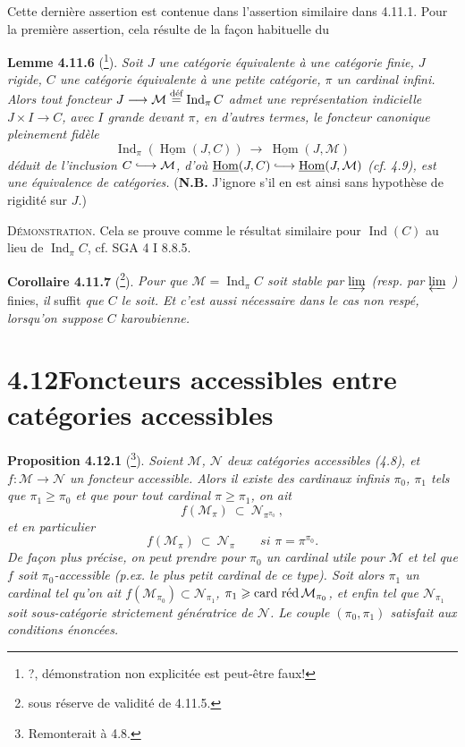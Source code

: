 \documentclass[11pt]{article}
\newcommand{\printedpage}[1]{\marginpar{\footnotesize p.~#1}}
\newcommand{\msp}[1]{\marginpar{\footnotesize [#1]}}
\newcommand{\defeq}{\overset{\text{\upshape déf}}{=}}
\newcommand{\cardred}{\operatorname{card}\,\text{\upshape réd}\,}
\newcommand{\Hom}{\underline{\operatorname{Hom}}}
\newcommand{\Ind}{\operatorname{Ind}}
\newcommand{\into}{\lhook\joinrel\longrightarrow}
\begin{document}
Cette dernière assertion est contenue dans l'assertion similaire dans 4.11.1. Pour la première assertion, cela résulte de la façon habituelle du

\textbf{Lemme 4.11.6} (\footnote{?, démonstration non explicitée est peut-être faux!}). \textit{Soit $J$ une catégorie équivalente à une catégorie finie, $J$ rigide, $C$ une catégorie équivalente à une petite catégorie, $\pi$ un cardinal infini. Alors tout foncteur}
\printedpage{102}
\textit{$J \longrightarrow \mathcal{M} \defeq \Ind_\pi C$ admet une représentation indicielle $J \times I \longrightarrow C$, avec $I$ grande devant $\pi$, en d'autres termes, le} \msp{page 272} \textit{foncteur canonique pleinement fidèle}
\[
\Ind_\pi(\Hom(J,C)) \ \longrightarrow \ \Hom(J,\mathcal{M})
\]
\textit{déduit de l'inclusion $C \into \mathcal{M}$, d'où $\Hom(J,C) \into \Hom(J,\mathcal{M})$ (cf. 4.9), est une équivalence de catégories.} (\textbf{N.B.} J'ignore s'il en est ainsi sans hypothèse de rigidité sur $J$.)

\textsc{Démonstration}. Cela se prouve comme le résultat similaire pour $\Ind(C)$ au lieu de $\Ind_\pi C$, cf. SGA 4 I 8.8.5.

\msp{page 273}

\textbf{Corollaire 4.11.7} (\footnote{sous réserve de validité de 4.11.5.}). \textit{Pour que $\mathcal{M} = \Ind_\pi C$ soit stable par $\varinjlim$ (resp. par $\varprojlim$ )} finies, \textit{il} suffit \textit{que $C$ le soit. Et c'est aussi nécessaire dans le cas non respé, lorsqu'on suppose $C$ karoubienne.}

\section*{4.12\quad Foncteurs accessibles entre catégories accessibles}

\textbf{Proposition 4.12.1} (\footnote{Remonterait à 4.8.}). \textit{Soient $\mathcal{M}$, $\mathcal{N}$ deux catégories accessibles (4.8), et $f : \mathcal{M} \longrightarrow \mathcal{N}$ un foncteur accessible. Alors il existe des cardinaux infinis $\pi_0$, $\pi_1$ tels que $\pi_1 \geqslant \pi_0$ et que pour tout cardinal $\pi \geqslant \pi_1$, on ait}
\[
f(\mathcal{M}_\pi) \ \subset \ \mathcal{N}_{\pi^{\pi_0}} \ , \tag*{(4.12.1)} %
\]
\textit{et en particulier}
\[
f(\mathcal{M}_\pi) \ \subset \ \mathcal{N}_\pi \qquad \textit{si } \pi = \pi^{\pi_0}. \tag*{(4.12.1.2)}
\]
\textit{De façon plus précise, on peut prendre pour $\pi_0$ un cardinal utile pour $\mathcal{M}$} \msp{page 274} \textit{et tel que $f$ soit $\pi_0$-accessible (p.ex. le plus petit cardinal de ce type). Soit alors $\pi_1$ un cardinal tel qu'on ait $f(\mathcal{M}_{\pi_0}) \subset \mathcal{N}_{\pi_1}$, $\pi_1 \geqslant \cardred \mathcal{M}_{\pi_0}$, et enfin tel que $\mathcal{N}_{\pi_1}$ soit} \textit{sous-catégorie strictement génératrice de $\mathcal{N}$. Le couple $(\pi_0,\pi_1)$ satisfait aux conditions énoncées.}
\end{document}
